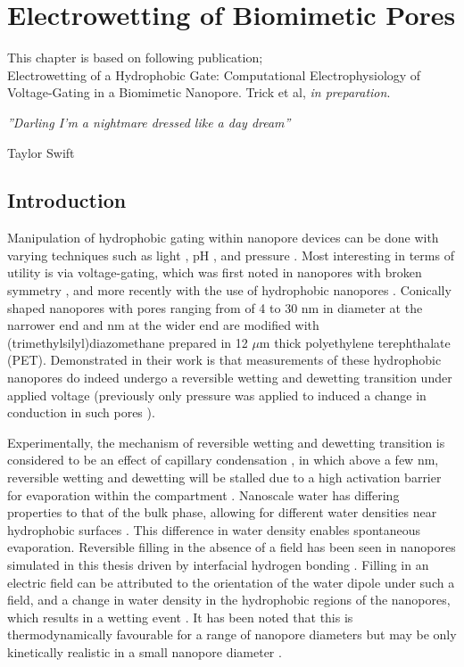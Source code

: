 \chapter{Electrowetting of Biomimetic Pores}
\label{ch:RC3}

This chapter is based on following publication; \\
Electrowetting of a Hydrophobic Gate: Computational Electrophysiology of Voltage-Gating in a Biomimetic Nanopore. Trick et al, \textit{in preparation}.

\vspace{10mm}
 
\epigraph{{\textit{''Darling I'm a nightmare dressed like a day dream''}}}{Taylor Swift}

\section{Introduction}

Manipulation of hydrophobic gating within nanopore devices can be done with varying techniques such as light \cite{Vlassiouk2006}, pH \cite{Rios2011}, and pressure \cite{Smirnov2010}. Most interesting in terms of utility is via voltage-gating, which was first noted in nanopores with broken symmetry \cite{Siwy2006}, and more recently with the use of hydrophobic nanopores \cite{Powell2011}. Conically shaped nanopores with pores ranging from  of 4 to 30 nm in diameter at the narrower end and  nm at the wider end are modified with (trimethylsilyl)diazomethane prepared in 12 $\mu$m  thick polyethylene terephthalate (PET). Demonstrated in their work is that measurements of these hydrophobic nanopores do indeed undergo a reversible wetting and dewetting transition under applied voltage (previously only pressure was applied to induced a change in conduction in such pores \cite{Smirnov2010}).

Experimentally, the mechanism of reversible wetting and dewetting transition is considered to be an effect of capillary condensation \cite{Sacha2006,Gomez-Monivas2003}, in which above a few nm, reversible wetting and dewetting will be stalled due to a high activation barrier for evaporation within the compartment \cite{Lee1984,Lum1997,Lum1998,Lefevre2004,Luzar2004,Husowitz2004,Smirnov2010}. Nanoscale water has differing properties to that of the bulk phase, allowing for different water densities near hydrophobic surfaces \cite{Lee1984,Doshi2005}. This difference in water density enables spontaneous evaporation. Reversible filling in the absence of a field has been seen in nanopores simulated in this thesis driven by interfacial hydrogen bonding \cite{Lee1984,Luzar1985,Daub2007}. Filling in an electric field can be attributed to the orientation of the water dipole under such a field, and a change in water density in the hydrophobic regions of the nanopores, which results in a wetting event \cite{Dzubiella2004d,Dzubiella2005,Smirnov2011}. It has been noted that this is thermodynamically favourable for a  range of nanopore diameters but may be only kinetically realistic in a small nanopore diameter \cite{Smirnov2011}. 

